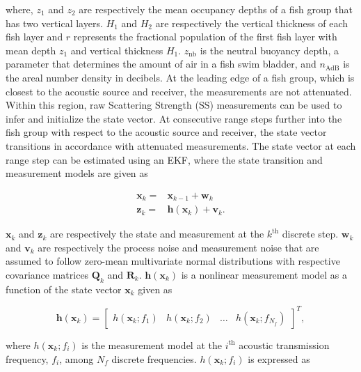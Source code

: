 \documentclass[technicalnote,oneauthor,latex,dvi2pdf,10pt,a4paper]{Definitions/mdpi}
\begin{document}
\noindent where, $z_1$ and $z_2$ are respectively the mean occupancy depths of a fish group that has two vertical layers. 
$H_1$ and $H_2$ are respectively the vertical thickness of each fish layer and $r$ represents the fractional population of the first fish layer with mean depth $z_1$ and vertical thickness $H_1$.
$z_\text{nb}$ is the neutral buoyancy depth, a parameter that determines the amount of air in a fish swim bladder, and $n_\text{AdB}$ is the areal number density in decibels.
At the leading edge of a fish group, which is closest to the acoustic source and receiver, the measurements are not attenuated. 
Within this region, raw Scattering Strength (SS) measurements can be used to infer and initialize the state vector.
At consecutive range steps further into the fish group with respect to the acoustic source and receiver, the state vector transitions in accordance with attenuated measurements.
The state vector at each range step can be estimated using an EKF, where the state transition and measurement models are given as

\begin{align}
\label{eq:model}
\mathbf{x}_k = & \mathbf{x}_{k-1} + \mathbf{w}_k \\ \nonumber
\mathbf{z}_k = & \mathbf{h}\left(\mathbf{x}_k\right) + \mathbf{v}_k.
\end{align}

\noindent $\mathbf{x}_k$ and $\mathbf{z}_k$ are respectively the state and measurement at the $k^\text{th}$ discrete step.
$\mathbf{w}_k$ and $\mathbf{v}_k$ are respectively the process noise and measurement noise that are assumed to follow zero-mean multivariate normal distributions with respective covariance matrices $\boldsymbol{Q}_k$ and $\boldsymbol{R}_k$.
$\mathbf{h}\left(\mathbf{x}_k\right)$ is a nonlinear measurement model as a function of the state vector $\mathbf{x}_k$ given as

\begin{equation}
\label{eq:modelMeasureVector}
\mathbf{h}\left(\mathbf{x}_k\right) = 
\begin{bmatrix}
h\left(\mathbf{x}_k;f_1\right) & h\left(\mathbf{x}_k;f_2\right) & \dots & h\left(\mathbf{x}_k;f_{N_f}\right)
\end{bmatrix}^T,
\end{equation}

\noindent where $h\left(\mathbf{x}_k;f_i\right)$ is the measurement model at the $i^\text{th}$ acoustic transmission frequency, $f_i$, among $N_f$ discrete frequencies.
$h\left(\mathbf{x}_k;f_i\right)$ is expressed as
\end{document}

